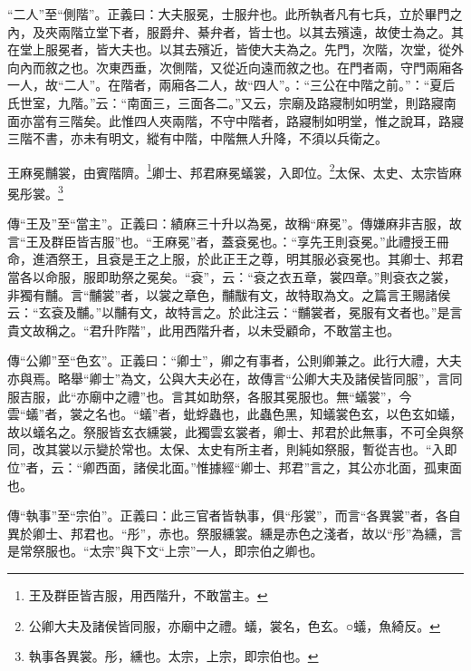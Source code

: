 {\noindent\shu{}\fzkt “二人”至“側階”。正義曰：大夫服冕，士服弁也。此所執者凡有七兵，立於畢門之內，及夾兩階立堂下者，服爵弁、綦弁者，皆士也。以其去殯遠，故使士為之。其在堂上服冕者，皆大夫也。以其去殯近，皆使大夫為之。先門，次階，次堂，從外向內而敘之也。次東西垂，次側階，又從近向遠而敘之也。在門者兩，守門兩廂各一人，故“二人”。在階者，兩廂各二人，故“四人”。：“三公在中階之前。”：“夏后氏世室，九階。”云：“南面三，三面各二。”又云，宗廟及路寢制如明堂，則路寢南面亦當有三階矣。此惟四人夾兩階，不守中階者，路寢制如明堂，惟之說耳，路寢三階不書，亦未有明文，縱有中階，中階無人升降，不須以兵衛之。 \par}

王麻冕黼裳，由賓階隮。\footnote{王及群臣皆吉服，用西階升，不敢當主。}卿士、邦君麻冕蟻裳，入即位。\footnote{公卿大夫及諸侯皆同服，亦廟中之禮。蟻，裳名，色玄。○蟻，魚綺反。}太保、太史、太宗皆麻冕彤裳。\footnote{執事各異裳。彤，纁也。太宗，上宗，即宗伯也。}


{\noindent\zhuan{}\fzbyks 傳“王及”至“當主”。正義曰：績麻三十升以為冕，故稱“麻冕”。傳嫌麻非吉服，故言“王及群臣皆吉服”也。“王麻冕”者，蓋袞冕也。：“享先王則袞冕。”此禮授王冊命，進酒祭王，且袞是王之上服，於此正王之尊，明其服必袞冕也。其卿士、邦君當各以命服，服即助祭之冕矣。“袞”，云：“袞之衣五章，裳四章。”則袞衣之裳，非獨有黼。言“黼裳”者，以裳之章色，黼黻有文，故特取為文。之篇言王賜諸侯云：“玄袞及黼。”以黼有文，故特言之。於此注云：“黼裳者，冕服有文者也。”是言貴文故稱之。“君升阼階”，此用西階升者，以未受顧命，不敢當主也。 \par}

{\noindent\zhuan{}\fzbyks 傳“公卿”至“色玄”。正義曰：“卿士”，卿之有事者，公則卿兼之。此行大禮，大夫亦與焉。略舉“卿士”為文，公與大夫必在，故傳言“公卿大夫及諸侯皆同服”，言同服吉服，此“亦廟中之禮”也。言其如助祭，各服其冕服也。無“蟻裳”，今雲“蟻”者，裳之名也。“蟻”者，蚍蜉蟲也，此蟲色黑，知蟻裳色玄，以色玄如蟻，故以蟻名之。祭服皆玄衣纁裳，此獨雲玄裳者，卿士、邦君於此無事，不可全與祭同，改其裳以示變於常也。太保、太史有所主者，則純如祭服，暫從吉也。“入即位”者，云：“卿西面，諸侯北面。”惟據經“卿士、邦君”言之，其公亦北面，孤東面也。 \par}

{\noindent\zhuan{}\fzbyks 傳“執事”至“宗伯”。正義曰：此三官者皆執事，俱“彤裳”，而言“各異裳”者，各自異於卿士、邦君也。“彤”，赤也。祭服纁裳。纁是赤色之淺者，故以“彤”為纁，言是常祭服也。“太宗”與下文“上宗”一人，即宗伯之卿也。 \par}

